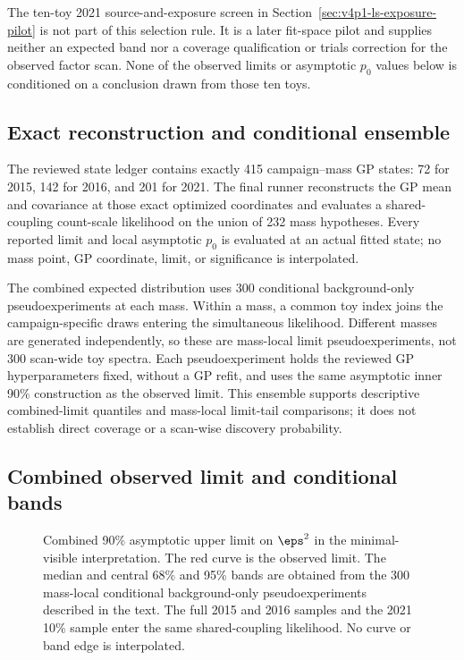 The ten-toy 2021 source-and-exposure screen in
Section~\ref{sec:v4p1-ls-exposure-pilot} is not part of this selection rule. It is
a later fit-space pilot and supplies neither an expected band nor a coverage
qualification or trials correction for the observed factor scan. None of the
observed limits or asymptotic $p_0$ values below is conditioned on a conclusion
drawn from those ten toys.

\subsection{Exact reconstruction and conditional ensemble}
\label{sec:results-v4p2-reconstruction}

The reviewed state ledger contains exactly 415 campaign--mass GP states: 72 for
2015, 142 for 2016, and 201 for 2021. The final runner reconstructs the GP mean
and covariance at those exact optimized coordinates and evaluates a shared-coupling
count-scale likelihood on the union of 232 mass hypotheses. Every
reported limit and local asymptotic $p_0$ is evaluated at an actual fitted state;
no mass point, GP coordinate, limit, or significance is interpolated.

The combined expected distribution uses 300 conditional background-only
pseudoexperiments at each mass. Within a mass, a common toy index joins the
campaign-specific draws entering the simultaneous likelihood. Different masses
are generated independently, so these are mass-local limit pseudoexperiments,
not 300 scan-wide toy spectra. Each pseudoexperiment holds the reviewed GP
hyperparameters fixed, without a GP refit, and uses the same asymptotic inner
90\% \CLs{} construction as the observed limit. This ensemble supports
descriptive combined-limit quantiles and mass-local limit-tail comparisons; it
does not establish direct \CLs{} coverage or a scan-wise discovery probability.

\subsection{Combined observed limit and conditional bands}
\label{sec:results-v4p2-combined-limit}
\label{sec:results-v4-combined-limit}

\begin{figure}[H]
\centering
{}
\caption{Combined 90\% asymptotic \CLs{} upper limit on $\eps^2$ in the
minimal-visible interpretation. The red curve is the observed limit. The median
and central 68\% and 95\% bands are obtained from the 300 mass-local
conditional background-only pseudoexperiments described in the text. The full
2015 and 2016
samples and the 2021 10\% sample enter the same shared-coupling likelihood. No
curve or band edge is interpolated.}
\label{fig:results-v4p2-combined-band}
\end{figure}

